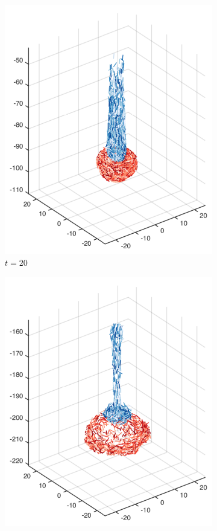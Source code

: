 \begin{figure}[htbp]
\begin{subfigure}[h]{0.24\textwidth}
    \includegraphics[width=\textwidth]{img/mixing/top_00020.pdf}
    \caption{$t=20$}\label{fig:mixing_top_b}
  \end{subfigure}
  \begin{subfigure}[h]{0.24\textwidth}
    \centering
    \includegraphics[width=\textwidth]{img/mixing/top_00060.pdf}

\end{subfigure}
\end{figure}
